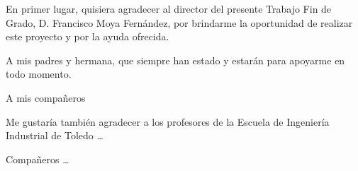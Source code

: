 \begin{agradecimientos}

    \itshape


    En primer lugar, quisiera agradecer al director del presente Trabajo Fin de Grado, D. Francisco Moya Fernández, por brindarme la oportunidad de realizar este proyecto  y por la ayuda ofrecida.

    A mis padres y hermana, que siempre han estado y estarán para apoyarme en todo momento.

    A mis compañeros




    Me gustaría también agradecer a los profesores de la Escuela de Ingeniería Industrial de Toledo \dots

    Compañeros \dots







 
\end{agradecimientos}